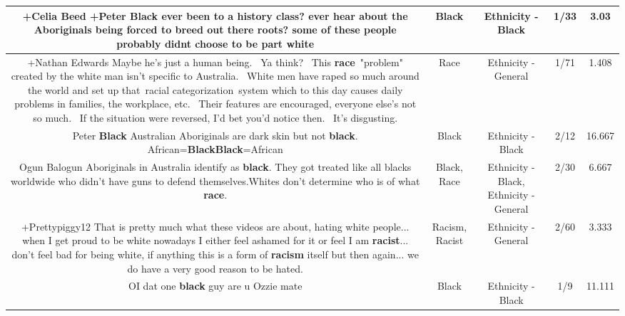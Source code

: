 \documentclass[11pt]{article}
\newlength\mylength
\begin{document}
\begin{center}
\begin{longtable}{|C{.65\mylength}|C{.30\mylength}|C{.12\mylength}|C{.12\mylength}|C{.12\mylength}|}
  \small +Celia Beed +Peter \textbf{Black} ever been to a history class? ever hear about the Aboriginals being forced to breed out there roots? some of these people probably didnt choose to be part white\normalsize   & Black & Ethnicity - Black & 1/33 & 3.03 \\  \hline
  \small +Nathan Edwards Maybe he's just a human being.  Ya think?  This \textbf{race} "problem" created by the white man isn't specific to Australia.  White men have raped so much around the world and set up that racial categorization system which to this day causes daily problems in families, the workplace, etc.  Their features are encouraged, everyone else's not so much.  If the situation were reversed, I'd bet you'd notice then.  It's disgusting.\normalsize   & Race & Ethnicity - General & 1/71 & 1.408 \\  \hline
  \small Peter \textbf{Black} Australian Aboriginals are dark skin but not \textbf{black}. African=\textbf{Black}\textbf{Black}=African\normalsize   & Black & Ethnicity - Black & 2/12 & 16.667 \\  \hline
  \small Ogun Balogun Aboriginals in Australia identify as \textbf{black}. They got treated like all blacks worldwide who didn't have guns to defend themselves.Whites don't determine who is of what \textbf{race}.\normalsize   & Black, Race & Ethnicity - Black, Ethnicity - General & 2/30 & 6.667 \\  \hline
  \small +Prettypiggy12 That is pretty much what these videos are about, hating white people... when I get proud to be white nowadays I either feel ashamed for it or feel I am \textbf{racist}... don't feel bad for being white, if anything this is a form of \textbf{racism} itself but then again... we do have a very good reason to be hated.\normalsize   & Racism, Racist & Ethnicity - General & 2/60 & 3.333 \\  \hline
  \small OI dat one \textbf{black} guy are u Ozzie mate\normalsize   & Black & Ethnicity - Black & 1/9 & 11.111 \\  \hline

\end{longtable}
\end{center}
\end{document}
